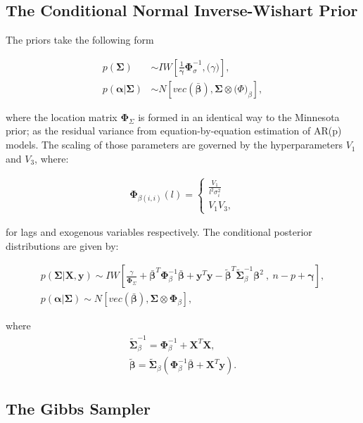 \documentclass[11pt,preprint, authoryear]{elsarticle}
\numberwithin{equation}{section}
\numberwithin{figure}{section}
\numberwithin{table}{section}
\begin{document}
\hypertarget{the-conditional-normal-inverse-wishart-prior}{%
\subsection{The Conditional Normal Inverse-Wishart
Prior}\label{the-conditional-normal-inverse-wishart-prior}}

The priors take the following form

\begin{align}
p(\bm{\Sigma}) &\sim IW[\frac{1}{\bm{\gamma}} \bm{\Phi}_\sigma^{-1} , \bm(\gamma)], \\
p(\bm{\alpha} | \bm{\Sigma}) &\sim N[vec(\bm{\bar{\beta}}) , \bm{\Sigma} \otimes  \bm(\Phi)_\beta],
\end{align}

where the location matrix \(\bm{\Phi}_\Sigma\) is formed in an identical
way to the Minnesota prior; as the residual variance from
equation-by-equation estimation of AR(p) models. The scaling of those
parameters are governed by the hyperparameters \(V_1\) and \(V_3\),
where:

\begin{align}
 \bm{\Phi}_{\beta(i,i)} (l) =
 \begin{cases} 
      \frac{V_1}{ l^2 \sigma^2_i} \\
      V_1 V_3 ,
\end{cases}
\end{align}

for lags and exogenous variables respectively. The conditional posterior
distributions are given by:

\begin{align}
p(\bm{\Sigma}| \bm{X}, \bm{y}) \sim IW[\frac{\gamma}{\bm{\Phi}_\Sigma} + \bar{\bm{\beta}}^T \bm{\Phi}_\beta^{-1} \bar{\bm{\beta}} + \bm{y}^T \bm{y} - \tilde{\bm{\beta}}^T  \tilde{\bm{\Sigma}}_\beta^{-1} \bm{\beta}^2  \  , \ n - p + \bm{\gamma} ], \\
p(\bm{\alpha} | \bm{\Sigma}) \sim N[vec(\bm{\bar{\beta}}) , \bm{\Sigma} \otimes  \bm{\Phi}_\beta ],
\end{align}

where \begin{align}
\tilde{\bm{\Sigma}}_\beta^{-1} = \bm{\Phi}_\beta^{-1} + \bm{X}^T \bm{X},  \\
\tilde{\bm{\beta}} = \tilde{\bm{\Sigma}}_\beta (\bm{\Phi}_\beta^{-1} \bar{\bm{\beta}} + \bm{X}^T \bm{y} ). 
\end{align}

\hypertarget{the-gibbs-sampler}{%
\subsection{The Gibbs Sampler}\label{the-gibbs-sampler}}
\end{document}
